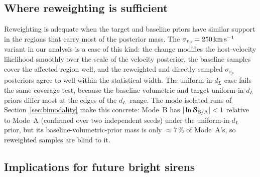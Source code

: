 \documentclass[usenatbib]{mnras}
\newcommand{\kms}{\ensuremath{\,\rm km\,s^{-1}}\xspace}
\newcommand{\dL}{\ensuremath{d_{L}}\xspace}
\newcommand{\sigmavp}{\ensuremath{\sigma_{v_p}}\xspace}
\begin{document}
\subsection{Where reweighting is sufficient}

Reweighting is adequate when the target and baseline priors have similar support in the regions that carry most of the posterior mass. The $\sigmavp=250\kms$ variant in our analysis is a case of this kind: the change modifies the host-velocity likelihood smoothly over the scale of the velocity posterior, the baseline samples cover the affected region well, and the reweighted and directly sampled $\sigmavp$ posteriors agree to well within the statistical width. The uniform-in-$d_L$ case fails the same coverage test, because the baseline volumetric and target uniform-in-$d_L$ priors differ most at the edges of the \dL\ range. The mode-isolated runs of Section~\ref{sec:bimodality} make this concrete: Mode~B has $|\ln \mathcal{B}_{\rm B/A}|<1$ relative to Mode~A (confirmed over two independent seeds) under the uniform-in-$d_L$ prior, but its baseline-volumetric-prior mass is only $\approx 7\,\%$ of Mode~A's, so reweighted samples are blind to it.

\subsection{Implications for future bright sirens}
\end{document}
